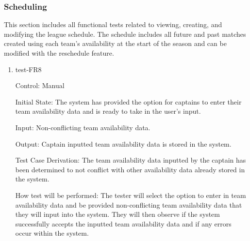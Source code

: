 \documentclass[12pt, titlepage]{article}
\begin{document}
\subsubsection{Scheduling}

This section includes all functional tests related to viewing, creating, and
modifying the league schedule. The schedule includes all future and past
matches created using each team's availability at the start of the season and
can be modified with the reschedule feature.

\begin{enumerate}

  \item{test-FR8\\}

  Control: Manual

  Initial State: The system has provided the option for captains to enter their team
  availability data and is ready to take in the user's input.

  Input: Non-conflicting team availability data.

  Output: Captain inputted team availability data is stored in the system.

  Test Case Derivation: The team availability data inputted by the captain has been
  determined to not conflict with other availability data already stored in the system.

  How test will be performed: The tester will select the option to enter in team 
  availability data and be provided non-conflicting team availability
  data that they will input into the system. They will then observe if the system successfully
  accepts the inputted team availability data and if any errors occur within the system.








\end{enumerate}
\end{document}
